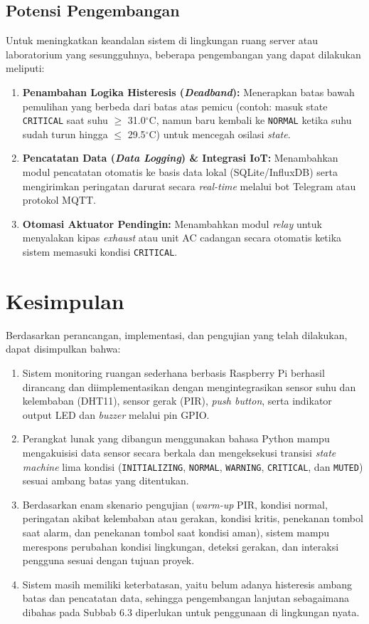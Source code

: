 \documentclass[12pt, a4paper]{article}
\begin{document}
\subsection{Potensi Pengembangan}
Untuk meningkatkan keandalan sistem di lingkungan ruang server atau laboratorium yang sesungguhnya, beberapa pengembangan yang dapat dilakukan meliputi:
\begin{enumerate}
    \item \textbf{Penambahan Logika Histeresis (\textit{Deadband}):} Menerapkan batas bawah pemulihan yang berbeda dari batas atas pemicu (contoh: masuk state \texttt{CRITICAL} saat suhu $\ge$ 31.0$^\circ$C, namun baru kembali ke \texttt{NORMAL} ketika suhu sudah turun hingga $\le$ 29.5$^\circ$C) untuk mencegah osilasi \textit{state}.
    \item \textbf{Pencatatan Data (\textit{Data Logging}) \& Integrasi IoT:} Menambahkan modul pencatatan otomatis ke basis data lokal (SQLite/InfluxDB) serta mengirimkan peringatan darurat secara \textit{real-time} melalui bot Telegram atau protokol MQTT.
    \item \textbf{Otomasi Aktuator Pendingin:} Menambahkan modul \textit{relay} untuk menyalakan kipas \textit{exhaust} atau unit AC cadangan secara otomatis ketika sistem memasuki kondisi \texttt{CRITICAL}.
\end{enumerate}

\section{Kesimpulan}
Berdasarkan perancangan, implementasi, dan pengujian yang telah dilakukan, dapat disimpulkan bahwa:
\begin{enumerate}
    \item Sistem monitoring ruangan sederhana berbasis Raspberry Pi berhasil dirancang dan diimplementasikan dengan mengintegrasikan sensor suhu dan kelembaban (DHT11), sensor gerak (PIR), \textit{push button}, serta indikator output LED dan \textit{buzzer} melalui pin GPIO.
    \item Perangkat lunak yang dibangun menggunakan bahasa Python mampu mengakuisisi data sensor secara berkala dan mengeksekusi transisi \textit{state machine} lima kondisi (\texttt{INITIALIZING}, \texttt{NORMAL}, \texttt{WARNING}, \texttt{CRITICAL}, dan \texttt{MUTED}) sesuai ambang batas yang ditentukan.
    \item Berdasarkan enam skenario pengujian (\textit{warm-up} PIR, kondisi normal, peringatan akibat kelembaban atau gerakan, kondisi kritis, penekanan tombol saat alarm, dan penekanan tombol saat kondisi aman), sistem mampu merespons perubahan kondisi lingkungan, deteksi gerakan, dan interaksi pengguna sesuai dengan tujuan proyek.
    \item Sistem masih memiliki keterbatasan, yaitu belum adanya histeresis ambang batas dan pencatatan data, sehingga pengembangan lanjutan sebagaimana dibahas pada Subbab 6.3 diperlukan untuk penggunaan di lingkungan nyata.
\end{enumerate}
\end{document}

